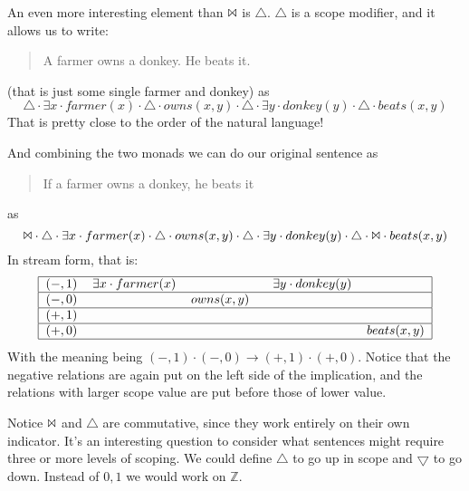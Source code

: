 \documentclass[12pt]{article}
\begin{document}
An even more interesting element than $\Bowtie$ is $\triangle$. $\triangle$ is a scope modifier, and it allows us to write:
%
\begin{quote}
A farmer owns a donkey. He beats it.
\end{quote}
%
(that is just some single farmer and donkey) as
%
\begin{equation}
\triangle \cdot \exists x \cdot farmer(x) \cdot \triangle \cdot owns(x,y) \cdot \triangle \cdot \exists y \cdot donkey(y) \cdot \triangle \cdot beats(x,y)
\end{equation}
%
That is pretty close to the order of the natural language!

And combining the two monads we can do our original sentence as
%
\begin{quote}
If a farmer owns a donkey, he beats it
\end{quote}
%
as
\begin{equation}
\Bowtie \cdot \triangle \cdot \exists x \cdot farmer(x) \cdot \triangle \cdot owns(x,y) \cdot \triangle \cdot \exists y \cdot donkey(y) \cdot \triangle \cdot \Bowtie \cdot beats(x,y)
\end{equation}
%
In stream form, that is:
%
\begin{equation}
\begin{tabular}{|cllll|}
    \hline
    $(-,1)$ & $\exists x \cdot farmer(x)$ & ~ & ~ $ \exists y \cdot donkey(y)$ & ~ \\\hline
    $(-,0)$ & ~ & $owns(x,y)$ & ~ & ~ \\\hline
    $(+,1)$ & ~ & ~ & ~ & ~ \\\hline
    $(+,0)$ & ~ & ~ & ~ & $beats(x,y)$ \\\hline
\end{tabular}
\end{equation}
%
With the meaning being $(-,1) \cdot (-,0) \rightarrow (+,1) \cdot (+,0)$. Notice that the negative relations are again put on the left side of the implication, and the relations with larger scope value are put before those of lower value.

Notice $\Bowtie$ and $\triangle$ are commutative, since they work entirely on their own indicator. It's an interesting question to consider what sentences might require three or more levels of scoping. We could define $\triangle$ to go up in scope and $\bigtriangledown$ to go down. Instead of ${0,1}$ we would work on $\mathbb{Z}$.
\end{document}
